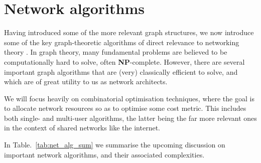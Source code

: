 %
%

\section{Network algorithms} \label{sec:graph_theory} 

Having introduced some of the more relevant graph structures, we now introduce some of the key graph-theoretic algorithms of direct relevance to networking theory \cite{bib:RivestAlgBook}. In graph theory, many fundamental problems are believed to be computationally hard to solve, often \textbf{NP}-complete. However, there are several important graph algorithms that are (very) classically efficient to solve, and which are of great utility to us as network architects.

We will focus heavily on combinatorial optimisation techniques, where the goal is to allocate network resources so as to optimise some cost metric. This includes both single- and multi-user algorithms, the latter being the far more relevant ones in the context of shared networks like the internet.

In Table.~\ref{tab:net_alg_sum} we summarise the upcoming discussion on important network algorithms, and their associated complexities.

\renewcommand{\tablename}{TABLE}

